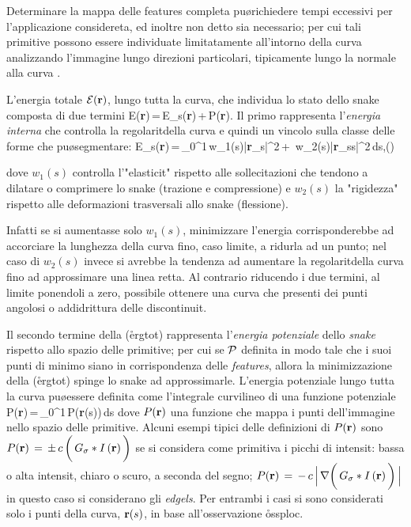 \boss
Determinare la mappa delle features completa pu\o richiedere tempi eccessivi per
l'applicazione considereta, ed inoltre non \e detto sia necessario; per cui tali
primitive possono essere individuate limitatamente all'intorno della curva analizzando
l'immagine lungo direzioni particolari, tipicamente lungo la normale alla curva
\cite{BlakeAC}.
\eoss

L'energia totale ${\cal E}({\bf r})$, lungo tutta la curva, che individua lo stato dello
snake \e composta di due termini
\be
{\cal E}({\bf r})\,=\,{\cal E}_s({\bf r})\,+\,{\cal P}({\bf r}).
\ee
\ben
\im
Il primo rappresenta l'{\it energia interna} che controlla la regolarit\a della curva
e quindi un vincolo sulla classe delle forme che pu\o segmentare:
\be
{\cal E}_s({\bf r})\,=\,\int_0^1\,w_1(s)|{\bf r}_s|^2\,+
                                \,w_2(s)|{\bf r}_{ss}|^2\,ds,\quad (\footnotemark)
\ee 


dove $w_1(s)$ controlla l'"elasticit\a" rispetto alle sollecitazioni che tendono a dilatare
o comprimere lo snake (trazione e compressione) e $w_2(s)$ la "rigidezza" rispetto alle 
deformazioni trasversali allo snake (flessione).

Infatti se si aumentasse solo $w_1(s)$, minimizzare l'energia corrisponderebbe ad accorciare
la lunghezza della curva fino, caso limite, a ridurla ad un punto; nel caso di $w_2(s)$
invece si avrebbe la tendenza ad aumentare la regolarit\a della curva fino ad approssimare
una linea retta. Al contrario riducendo i due termini, al limite ponendoli a zero\footnotemark,
\e possibile ottenere una curva che presenti dei punti angolosi o addidrittura delle
discontinuit\a.


\im
Il secondo termine della (\r{ergtot}) rappresenta l'{\it energia potenziale} dello {\it snake}
rispetto allo spazio delle primitive; per cui se $\cal P$ \e definita in modo tale
che i suoi punti di minimo siano in corrispondenza delle {\it features}, allora la minimizzazione
della (\r{ergtot}) spinge lo snake ad approssimarle.
L'energia potenziale lungo tutta la curva pu\o essere definita come l'integrale curvilineo
di una funzione potenziale 
\be
{\cal P}({\bf r})\,=\,\int_0^1\,P({\bf r}(s))\,ds
\ee
dove $P({\bf r})$ \e una funzione che mappa i punti dell'immagine nello spazio delle primitive.
Alcuni esempi tipici delle definizioni di $P({\bf r})$ sono
 \ben
 \im $P({\bf r})\,=\,\pm\,c\,\bigg(\,G_\sigma \ast I\,({\bf r})\,\bigg)$
     se si considera come primitiva i picchi di intensit\aac: bassa o alta intensit\aac, chiaro o
     scuro, a seconda del segno;
 \im $P({\bf r})\,=\,-\,c\,\Big|\,\nabla\bigg(\,G_\sigma \ast I\,({\bf r})\,\bigg)\,\Big|$
     in questo caso si considerano gli {\it edgels}.
 \een
Per entrambi i casi si sono considerati solo i punti della curva, ${\bf r}(s)$, in base
all'osservazione \r{ossploc}.

